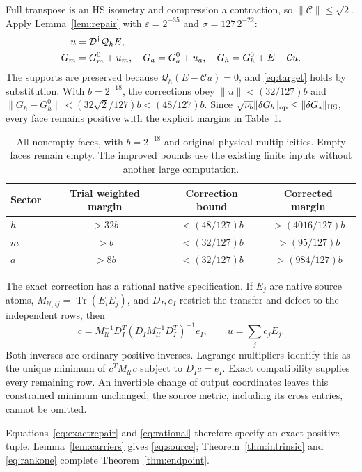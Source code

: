\documentclass[11pt,a4paper]{article}
\theoremstyle{definition}\newtheorem{definition}[theorem]{Definition}
\theoremstyle{remark}\newtheorem{remark}[theorem]{Remark}
\DeclareMathOperator{\Tr}{Tr}\DeclareMathOperator{\rank}{rank}
\numberwithin{equation}{section}
\begin{document}
Full transpose is an HS isometry and compression a contraction,
so $\|\mathcal C\|\le\sqrt2$.
Apply Lemma~\ref{lem:repair} with
$\varepsilon=2^{-35}$ and $\sigma=127\,2^{-22}$:
\begin{align}
u&=\mathcal D^\dagger\mathcal Q_hE,\notag\\
G_m&=G_m^0+u_m,\quad G_a=G_a^0+u_a,\quad
G_h=G_h^0+E-\mathcal Cu.
\label{eq:exactrepair}
\end{align}
The supports are preserved because
$\mathcal Q_h(E-\mathcal Cu)=0$, and \eqref{eq:target} holds by
substitution. With $b=2^{-18}$, the corrections obey
$\|u\|<(32/127)b$ and
$\|G_h-G_h^0\|<(32\sqrt2/127)b<(48/127)b$.
Since $\sqrt{\nu_b}\|\delta G_b\|_{\rm op}\le\|\delta G_s\|_{\rm HS}$,
every face remains positive with the explicit margins in
Table~\ref{tab:margins}.

\begin{table}[ht]
\centering
\begin{tabular}{@{}lccc@{}}
\toprule
Sector & Trial weighted margin & Correction bound & Corrected margin\\
\midrule
$h$ & $>32b$ & $<(48/127)b$ & $>(4016/127)b$\\
$m$ & $>b$ & $<(32/127)b$ & $>(95/127)b$\\
$a$ & $>8b$ & $<(32/127)b$ & $>(984/127)b$\\
\bottomrule
\end{tabular}
\caption{All nonempty faces, with $b=2^{-18}$ and original physical
multiplicities. Empty faces remain empty. The improved bounds use
the existing finite inputs without another large computation.}
\label{tab:margins}
\end{table}

The exact correction has a rational native specification.
If $E_j$ are native source atoms,
$M_{\mathcal U,ij}=\Tr(E_iE_j)$, and $D_I,e_I$ restrict the transfer
and defect to the independent rows, then
\begin{equation}
c=M_{\mathcal U}^{-1}D_I^T
 (D_IM_{\mathcal U}^{-1}D_I^T)^{-1}e_I,\qquad u=\sum_jc_jE_j.
\label{eq:rational}
\end{equation}
Both inverses are ordinary positive inverses.
Lagrange multipliers identify this as the unique minimum of
$c^TM_{\mathcal U}c$ subject to $D_Ic=e_I$.
Exact compatibility supplies every remaining row. An invertible
change of output coordinates leaves this constrained minimum unchanged;
the source metric, including its cross entries, cannot be omitted.

Equations~\eqref{eq:exactrepair} and \eqref{eq:rational} therefore
specify an exact positive tuple. Lemma~\ref{lem:carriers} gives
\eqref{eq:source}; Theorem~\ref{thm:intrinsic} and
\eqref{eq:rankone} complete Theorem~\ref{thm:endpoint}.
\end{document}

